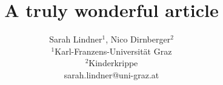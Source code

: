 

\title{A truly wonderful article}

\author{Sarah Lindner$^{1}$, Nico Dirnberger$^{2}$
\\
$^1$Karl-Franzens-Universit\"at Graz\\
$^2$Kinderkrippe\\
sarah.lindner@uni-graz.at
}

\maketitle